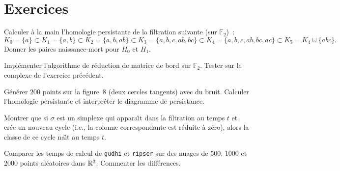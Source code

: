 \section{Exercices}

\begin{exercice}
Calculer \`a la main l'homologie persistante de la filtration suivante
(sur $\mathbb{F}_2$)~:
\[
  K_0 = \{a\} \subset K_1 = \{a, b\} \subset K_2 = \{a, b, ab\}
  \subset K_3 = \{a, b, c, ab, bc\}
  \subset K_4 = \{a, b, c, ab, bc, ac\}
  \subset K_5 = K_4 \cup \{abc\}.
\]
Donner les paires naissance-mort pour $H_0$ et $H_1$.
\end{exercice}

\begin{exercice}
Impl\'ementer l'algorithme de r\'eduction de matrice de bord sur
$\mathbb{F}_2$. Tester sur le complexe de l'exercice pr\'ec\'edent.
\end{exercice}

\begin{exercice}
G\'en\'erer $200$ points sur la figure~$8$ (deux cercles tangents) avec
du bruit. Calculer l'homologie persistante et interpr\'eter le
diagramme de persistance.
\end{exercice}

\begin{exercice}
Montrer que si $\sigma$ est un simplexe qui appara\^{\i}t dans la
filtration au temps $t$ et cr\'ee un nouveau cycle (i.e., la colonne
correspondante est r\'eduite \`a z\'ero), alors la classe de ce cycle
na\^{\i}t au temps $t$.
\end{exercice}

\begin{exercice}
Comparer les temps de calcul de \texttt{gudhi} et \texttt{ripser} sur
des nuages de $500$, $1000$ et $2000$ points al\'eatoires dans $\mathbb{R}^3$.
Commenter les diff\'erences.
\end{exercice}
